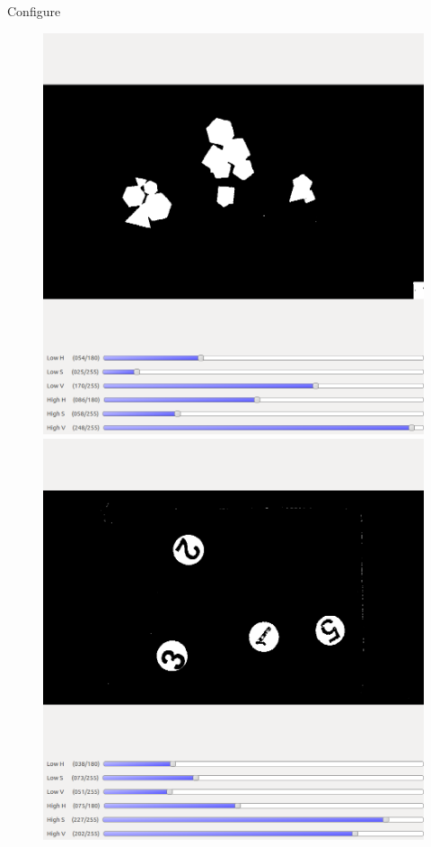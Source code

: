 \begin{frame}[fragile]{Configure}
\begin{figure}[H]
	\begin{minipage}{0.48\linewidth}
		\includegraphics[width=\linewidth]{Immagini/filterRed}
	\end{minipage}
	\vspace{0.04\linewidth}
	\begin{minipage}{0.48\linewidth}
		\includegraphics[width=\linewidth]{Immagini/filterGreen}
	\end{minipage}
\end{figure}
\end{frame}

